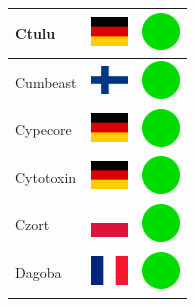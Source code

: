 \documentclass[12pt, a4paper, twoside]{report}
\begin{document}
\begin{center}
\begin{longtable}{|p{5cm}|p{2cm}|p{2cm}|}
 Ctulu                                                      & \includegraphics[width=1cm]{../4x3/de} &   \includegraphics[width=1cm]{../likes/y} \\ \hline
 Cumbeast                                                   & \includegraphics[width=1cm]{../4x3/fi} &   \includegraphics[width=1cm]{../likes/y} \\ \hline
 Cypecore                                                   & \includegraphics[width=1cm]{../4x3/de} &   \includegraphics[width=1cm]{../likes/y} \\ \hline
 Cytotoxin                                                  & \includegraphics[width=1cm]{../4x3/de} &   \includegraphics[width=1cm]{../likes/y} \\ \hline
 Czort                                                      & \includegraphics[width=1cm]{../4x3/pl} &   \includegraphics[width=1cm]{../likes/y} \\ \hline
 Dagoba                                                     & \includegraphics[width=1cm]{../4x3/fr} &   \includegraphics[width=1cm]{../likes/y} \\ \hline

\end{longtable}
\end{center}
\end{document}

